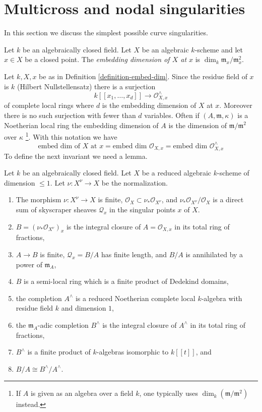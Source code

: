 \section{Multicross and nodal singularities}
\label{section-multicross}

\noindent
In this section we discuss the simplest possible curve singularities.

\begin{definition}
\label{definition-embed-dim}
Let $k$ be an algebraically closed field. Let $X$ be an algebraic
$k$-scheme and let $x \in X$ be a closed point. The
{\it embedding dimension of $X$ at $x$} is
$\dim_k \mathfrak m_x/\mathfrak m_x^2$.
\end{definition}

\noindent
Let $k, X, x$ be as in Definition \ref{definition-embed-dim}.
Since the residue field of $x$ is $k$ (Hilbert Nullstellensatz)
there is a surjection
$$
k[[x_1, \ldots, x_d]] \longrightarrow \mathcal{O}_{X, x}^\wedge
$$
of complete local rings where $d$ is the embedding dimension of $X$ at $x$.
Moreover there is no such surjection with fewer than $d$ variables.
Often
if $(A, \mathfrak m, \kappa)$ is a Noetherian local ring
the embedding dimension of $A$ is the dimension of
$\mathfrak m/\mathfrak m^2$ over $\kappa$
\footnote{If $A$ is given as an algebra over a field $k$,
one typically uses $\dim_k(\mathfrak m/\mathfrak m^2)$ instead.}.
With this notation we have
$$
\text{embed dim of }X\text{ at }x =
\text{embed dim }\mathcal{O}_{X, x} =
\text{embed dim }\mathcal{O}_{X, x}^\wedge
$$
To define the next invariant we need a lemma.

\begin{lemma}
\label{lemma-prepare-delta-invariant}
Let $k$ be an algebraically closed field. Let $X$ be a reduced algebraic
$k$-scheme of dimension $\leq 1$. Let $\nu : X^\nu \to X$
be the normalization.
\begin{enumerate}
\item The morphism $\nu : X^\nu \to X$ is finite,
$\mathcal{O}_X \subset \nu_*\mathcal{O}_{X^\nu}$, and
$\nu_*\mathcal{O}_{X^\nu}/\mathcal{O}_X$
is a direct sum of skyscraper sheaves $\mathcal{Q}_x$
in the singular points $x$ of $X$.
\item $B = (\nu_*\mathcal{O}_{X^\nu})_x$ is the integral closure
of $A = \mathcal{O}_{X, x}$ in its total ring of fractions,
\item $A \to B$ is finite, $\mathcal{Q}_x = B/A$ has finite length,
and $B/A$ is annihilated by a power of $\mathfrak m_A$,
\item $B$ is a semi-local ring which is a finite product of
Dedekind domains,
\item the completion $A^\wedge$ is a reduced Noetherian complete
local $k$-algebra with residue field $k$ and dimension $1$,
\item the $\mathfrak m_A$-adic completion $B^\wedge$ is the
integral closure of $A^\wedge$ in its total ring of fractions,
\item $B^\wedge$ is a finite product of $k$-algebras isomorphic to
$k[[t]]$, and
\item $B/A \cong B^\wedge/A^\wedge$.
\end{enumerate}
\end{lemma}

